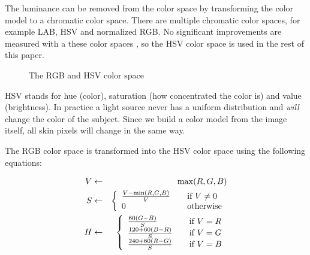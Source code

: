 The luminance can be removed from the color space by transforming the color model to a chromatic color space. There are multiple chromatic color spaces, for example LAB, HSV and normalized RGB. No significant improvements are measured with a these color spaces \cite{vsa03survey, Bradski1998}, so the HSV color space is used in the rest of this paper.

\begin{figure}[htbp]
  \centering
{}
\hspace{0.01\linewidth}
  \caption{The RGB and HSV color space}
  \label{fig:colorspaces}
\end{figure}

HSV stands for hue (color), saturation (how concentrated the color is) and value (brightness). In practice a light source never has a uniform distribution and \emph{will} change the color of the subject. Since we build a color model from the image itself, all skin pixels will change in the same way. 

The RGB color space is transformed into the HSV color space using the following equations:


\begin{eqnarray}
  V & \leftarrow & \max(R,G,B) \\
  S & \leftarrow & \left\{
  \begin{array}{l l}
    \frac{V-\min(R, G, B)}{V} & \quad \text{if $V \neq 0$} \\
    0 						  & \quad \text{otherwise} \\
  \end{array} \right.\\
  H & \leftarrow & \left\{
  \begin{array}{l l}
    \frac{60(G - B)}{S}     & \quad \text{if $V = R$} \\
    \frac{120 + 60(B-R)}{S} & \quad \text{if $V = G$} \\
    \frac{240 + 60(R-G)}{S} & \quad \text{if $V = B$} \\
  \end{array} \right.
\end{eqnarray}

